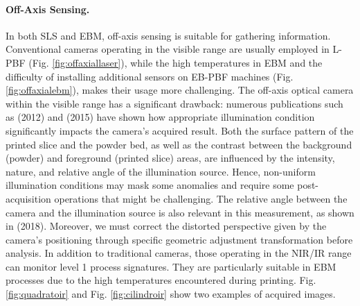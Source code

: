 \paragraph{Off-Axis Sensing.} In both SLS and EBM, off-axis sensing is suitable for gathering information. Conventional cameras operating in the visible range are usually employed in L-PBF (Fig. \ref{fig:offaxiallaser}), while the high temperatures in EBM and the difficulty of installing additional sensors on EB-PBF machines (Fig. \ref{fig:offaxialebm}), makes their usage more challenging. The off-axis optical camera within the visible range has a significant drawback: numerous publications such as \citealt{kleszczynski_error_2012} (2012) and \citeauthor{foster_bk_optical_2015} (2015) have shown how appropriate illumination condition significantly impacts the camera's acquired result. Both the surface pattern of the printed slice and the powder bed, as well as the contrast between the background (powder) and foreground (printed slice) areas, are influenced by the intensity, nature, and relative angle of the illumination source. Hence, non-uniform illumination conditions may mask some anomalies and require some post-acquisition operations that might be challenging. The relative angle between the camera and the illumination source is also relevant in this measurement, as shown in  \citeauthor{caltanissetta_characterization_2018} (2018). Moreover, we must correct the distorted perspective given by the camera's positioning through specific geometric adjustment transformation before analysis. In addition to traditional cameras, those operating in the NIR/IR range can monitor level 1 process signatures. They are particularly suitable in EBM processes due to the high temperatures encountered during printing. Fig. \ref{fig:quadratoir} and Fig. \ref{fig:cilindroir} show two examples of acquired images. 
